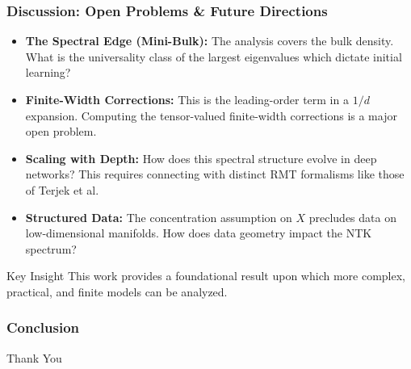 \documentclass[10pt]{beamer}
\begin{document}
\begin{frame}
    \frametitle{Discussion: Open Problems & Future Directions}
    \begin{itemize}
        \item \textbf{The Spectral Edge (Mini-Bulk):} The analysis covers the bulk density. What is the universality class of the largest eigenvalues which dictate initial learning?
        \vspace{0.5cm}
        \item \textbf{Finite-Width Corrections:} This is the leading-order term in a $1/d$ expansion. Computing the tensor-valued finite-width corrections is a major open problem.
        \vspace{0.5cm}
        \item \textbf{Scaling with Depth:} How does this spectral structure evolve in deep networks? This requires connecting with distinct RMT formalisms like those of Terjek et al.
        \vspace{0.5cm}
        \item \textbf{Structured Data:} The concentration assumption on $X$ precludes data on low-dimensional manifolds. How does data geometry impact the NTK spectrum?
    \end{itemize}
    \begin{alertblock}{Key Insight}
    This work provides a foundational result upon which more complex, practical, and finite models can be analyzed.
    \end{alertblock}
\end{frame}

\begin{frame}
    \frametitle{Conclusion}
    \begin{center}
        \vspace{1.5cm}
        \Huge Thank You
    \end{center}
\end{frame}
\end{document}
